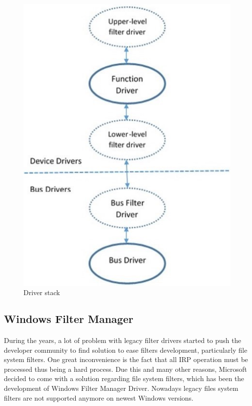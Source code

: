 	   	\begin{figure}[h!]
	   		\begin{center}
		   		\includegraphics[scale=0.7]{images/DriverStack.jpg}
		   		\caption{Driver stack\cite{WindowsDriverTutorial}}
		   		\label{fig:driverstack}
	   		\end{center}
	   	\end{figure}
	   
	   
		\subsection{Windows Filter Manager}
		\paragraph{}
		During the years, a lot of problem with legacy filter drivers started to push the developer community to find solution to ease filters development, particularly file system filters. One great inconvenience is the fact that all IRP operation must be processed thus being a hard process. Due this and many other reasons, Microsoft decided to come with a solution regarding file system filters, which has been the development of Windows Filter Manager Driver. Nowadays legacy files system filters are not supported anymore on newest Windows versions. 
		

